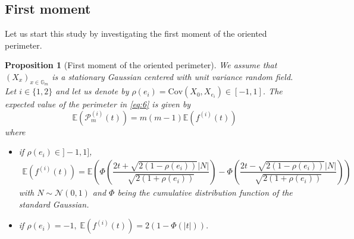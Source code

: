 \documentclass[12pt]{article}
\theoremstyle{Theorem}
\newtheorem{Proposition}[Theorem]{Proposition}
\theoremstyle{definition}
\begin{document}
\subsection{First moment}
Let us start this study by investigating the first moment of the oriented perimeter.
\begin{Proposition}[First moment of the oriented perimeter] 
\label{propFisrtmoment}
We assume that $\left(X_x \right)_{x \in \mathbb{G}_{m}}$ is a stationary Gaussian centered with unit variance random field. Let $i \in \{1,2\}$ and let us denote by  $\rho(e_i) = \text{Cov}\left(X_{\scriptscriptstyle 0}, X_{e_i}\right) \in [-1, 1]$. The expected value of the perimeter in \eqref{eq:6} is  given by $$\mathbb{E}\left(\mathcal{P}_{m}^{\scriptscriptstyle (i)}(t)\right) = m(m-1)\mathbb{E}\left(f^{(i)}(t) \right)$$ where
\begin{itemize}
  \item if $\rho(e_{i}) \in ]-1,1]$, 
    {\small
  \begin{align}
  \label{propEquationFisrtmoment}
  \mathbb{E}\left(f^{(i)}(t) \right) = \mathbb{E}\left(\Phi\left(\dfrac{2t + \sqrt{2(1-\rho(e_i))}|N|}{\sqrt{2(1+\rho(e_i))}}\right)  - \Phi\left(\dfrac{2t - \sqrt{2(1-\rho(e_i))}|N|}{\sqrt{2(1+\rho(e_i))}}\right)\right)
  \end{align}}
with $N \sim \mathcal{N}(0,1)$ and $\Phi$ being the cumulative distribution function of the standard Gaussian. 
\item if $\rho(e_i) = -1, \; \mathbb{E}\left(f^{(i)}(t) \right)= 2\left(1 - \Phi\left(|t|\right)\right).$
  \end{itemize}
\end{Proposition}
\end{document}
